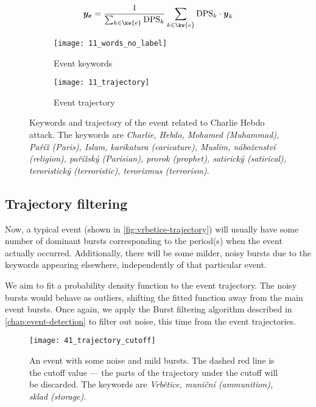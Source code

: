 \begin{equation}
	\vect{\traj_{e}} = \frac{1}{\sum_{k \in \kw{e}}{\text{DPS}_{k}}} \sum_{k \in \kw{e}}{\text{DPS}_{k} \cdot \vect{\traj}_{k}}
\end{equation}


\begin{figure}[H]
\centering
\begin{subfigure}{.5\textwidth}
  \centering
  \texttt{[image: 11\_words\_no\_label]}  %
  \caption{Event keywords}
  \label{fig:hebdo-words}
\end{subfigure}%
\begin{subfigure}{.5\textwidth}
  \centering
  \texttt{[image: 11\_trajectory]}  %
  \caption{Event trajectory}
  \label{fig:hebdo-trajectory}
\end{subfigure}
\caption{Keywords and trajectory of the event related to Charlie Hebdo attack. The keywords are \textit{Charlie, Hebdo, Mohamed (Muhammad), Paříž (Paris), Islam, karikatura (caricature), Muslim, náboženství (religion), pařížský (Parisian), prorok (prophet), satirický (satirical), teroristický (terroristic), terorizmus (terrorism)}.}
\end{figure}


\subsection{Trajectory filtering}

Now, a typical event (shown in \autoref{fig:vrbetice-trajectory}) will usually have some number of dominant bursts corresponding to the period(s) when the event actually occurred. Additionally, there will be some milder, noisy bursts due to the keywords appearing elsewhere, independently of that particular event.

We aim to fit a probability density function to the event trajectory. The noisy bursts would behave as outliers, shifting the fitted function away from the main event bursts. Once again, we apply the Burst filtering algorithm described in \autoref{chap:event-detection} to filter out noise, this time from the event trajectories.


\begin{figure}
  \centering
  \texttt{[image: 41\_trajectory\_cutoff]}  %
  \caption{An event with some noise and mild bursts. The dashed red line is the cutoff value --- the parts of the trajectory under the cutoff will be discarded. The keywords are \textit{Vrbětice, muniční (ammunition), sklad (storage)}.}
  \label{fig:vrbetice-trajectory}
\end{figure}


